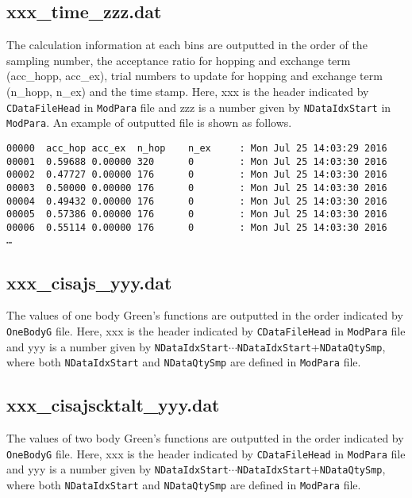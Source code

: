 \newpage
\subsection{xxx\_time\_zzz.dat }
\label{subsec:time}
The calculation information at each bins are outputted in the order of the sampling number, the acceptance ratio for hopping and exchange term (acc\_hopp, acc\_ex), trial numbers to update for hopping and exchange term (n\_hopp, n\_ex) and the time stamp.
Here, xxx is the header indicated by \verb|CDataFileHead| in \verb|ModPara| file and zzz is a number given by \verb|NDataIdxStart| in \verb|ModPara|.
An example of outputted file is shown as follows.

\begin{minipage}{15.5cm}
\begin{screen}
\begin{verbatim}
00000  acc_hop acc_ex  n_hop    n_ex     : Mon Jul 25 14:03:29 2016
00001  0.59688 0.00000 320      0        : Mon Jul 25 14:03:30 2016
00002  0.47727 0.00000 176      0        : Mon Jul 25 14:03:30 2016
00003  0.50000 0.00000 176      0        : Mon Jul 25 14:03:30 2016
00004  0.49432 0.00000 176      0        : Mon Jul 25 14:03:30 2016
00005  0.57386 0.00000 176      0        : Mon Jul 25 14:03:30 2016
00006  0.55114 0.00000 176      0        : Mon Jul 25 14:03:30 2016    
…
\end{verbatim}
\end{screen}
\end{minipage}

\subsection{xxx\_cisajs\_yyy.dat }
The values of one body Green's functions are outputted in the order indicated by \verb|OneBodyG| file.
Here, xxx is the header indicated by \verb|CDataFileHead| in \verb|ModPara| file and yyy is a number given by \verb|NDataIdxStart|$\cdots$\verb|NDataIdxStart|+\verb|NDataQtySmp|, where both \verb|NDataIdxStart| and \verb|NDataQtySmp| are defined in \verb|ModPara| file.

\subsection{xxx\_cisajscktalt\_yyy.dat }
The values of two body Green's functions are outputted in the order indicated by \verb|OneBodyG| file.
Here, xxx is the header indicated by \verb|CDataFileHead| in \verb|ModPara| file and yyy is a number given by \verb|NDataIdxStart|$\cdots$\verb|NDataIdxStart|+\verb|NDataQtySmp|, where both \verb|NDataIdxStart| and \verb|NDataQtySmp| are defined in \verb|ModPara| file.
